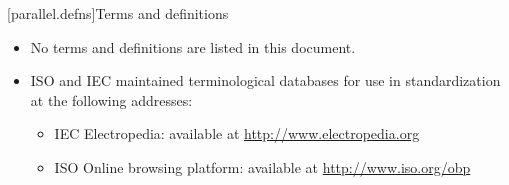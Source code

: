 
[parallel.defns]{Terms and definitions}

\begin{itemize}
\item No terms and definitions are listed in this document.
\item ISO and IEC maintained terminological databases for use in standardization at the following addresses:
  \begin{itemize}
    \item IEC Electropedia: available at \url{http://www.electropedia.org}
    \item ISO Online browsing platform: available at \url{http://www.iso.org/obp}
  \end{itemize}
\end{itemize}
